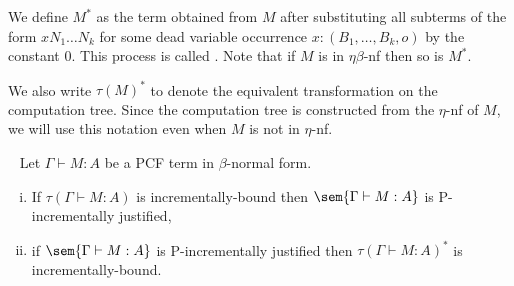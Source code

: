 We define $M^*$ as the term obtained from $M$ after substituting all subterms of the form  $x N_1 \dots N_k$ for some dead variable occurrence $x:(B_1,\ldots, B_k, o)$ by the constant $0$. This process is called .
Note that if $M$ is in $\eta\beta$-nf then so is $M^*$.

We also write $\tau(M)^*$ to denote the equivalent transformation on the computation tree. Since the computation tree is constructed from the $\eta$-nf of $M$, we will use this notation even when $M$ is not in $\eta$-nf.



\begin{proposition} \
\label{prop:incrbound_imp_incrjustified_pcf} Let $\Gamma \vdash M : A$ be a PCF term in $\beta$-normal form.
\begin{enumerate}[(i)]
\item  If $\tau(\Gamma \vdash M : A)$ is incrementally-bound then $\sem{\Gamma \vdash M : A}$ is P-incrementally justified,
\item  if $\sem{\Gamma \vdash M : A}$ is P-incrementally justified
then $\tau(\Gamma \vdash M : A)^*$ is incrementally-bound.
\end{enumerate}
\end{proposition}
